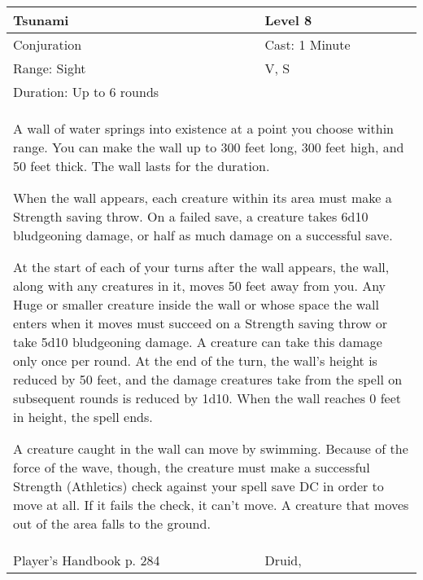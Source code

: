 \documentclass[11pt]{report}
\begin{document}
\begin{table}[H]
	\begin{tabular}{||p{6cm}|p{6cm}||}
		\hline\hline
		\bf{Tsunami} & Level 8\\ \hline
		Conjuration & Cast: 1 Minute\\ \hline
		Range: Sight & V, S\\ \hline
		Duration: Up to 6 rounds & \\ \hline
		\multicolumn{2}{||p{12cm}||}{A wall of water springs into existence at a point you choose within range. You can make the wall up to 300 feet long, 300 feet high, and 50 feet thick. The wall lasts for the duration.

When the wall appears, each creature within its area must make a Strength saving throw. On a failed save, a creature takes 6d10 bludgeoning damage, or half as much damage on a successful save.

At the start of each of your turns after the wall appears, the wall, along with any creatures in it, moves 50 feet away from you. Any Huge or smaller creature inside the wall or whose space the wall enters when it moves must succeed on a Strength saving throw or take 5d10 bludgeoning damage. A creature can take this damage only once per round. At the end of the turn, the wall’s height is reduced by 50 feet, and the damage creatures take from the spell on subsequent rounds is reduced by 1d10. When the wall reaches 0 feet in height, the spell ends.

A creature caught in the wall can move by swimming. Because of the force of the wave, though, the creature must make a successful Strength (Athletics) check against your spell save DC in order to move at all. If it fails the check, it can’t move. A creature that moves out of the area falls to the ground.}\\ \hline
Player's Handbook p. 284 & Druid, \\ \hline\hline
	\end{tabular}
\end{table}
\end{document}
